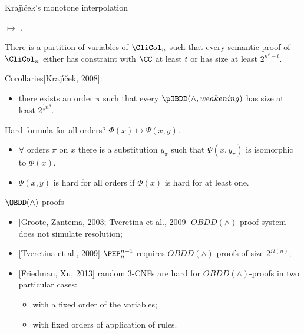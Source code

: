 \begin{frame}{Kraj{\'{\i}}{\v{c}}ek's monotone interpolation}

     $\mapsto$
    .

    \pause

    \begin{theorem}[Kraj{\'{\i}}{\v{c}}ek, 1997]
        There is a partition of variables of $\CliCol_n$ such that every semantic proof of $\CliCol_n$
        either has constraint with $\CC$ at least $t$ or has size at least $2^{n^{\delta} - t}$. 
    \end{theorem}

    \pause

    Corollaries[Kraj{\'{\i}}{\v{c}}ek, 2008]:
    \begin{itemize}
        \item there exists an order $\pi$ such that every $\pOBDD(\land,
            weakening)$ has size at least $2^{\frac{1}{2} n^\delta}$.
    \end{itemize}

    \pause
    Hard formula for all orders? \pause $\Phi(x) \mapsto \Psi(x, y)$.
    
    \begin{itemize}
        \item $\forall$ orders $\pi$ on $x$ there is a substitution $y_{\pi}$ such that $\Psi(x,
            y_{\pi})$ is isomorphic to $\Phi(x)$.
        \item $\Psi(x, y)$ is hard for all orders if $\Phi(x)$ is hard for at least one.
    \end{itemize}
\end{frame}

\begin{frame}{$\OBDD(\land)$-proofs}
    \begin{itemize}
        \item{} [Groote, Zantema, 2003; Tveretina et al., 2009] $OBDD(\land)$-proof system does
            not simulate resolution;
        \item{} [Tveretina et al., 2009] $\PHP^{n + 1}_n$ requires $OBDD(\land)$-proofs of size
            $2^{\Omega(n)}$;
        \item{} [Friedman, Xu, 2013] random $3$-CNFs are hard for $OBDD(\land)$-proofs in two particular
            cases:
            \begin{itemize}
                \item with a fixed order of the variables;
                \item with fixed orders of application of rules.
            \end{itemize}
    \end{itemize}    
\end{frame}


